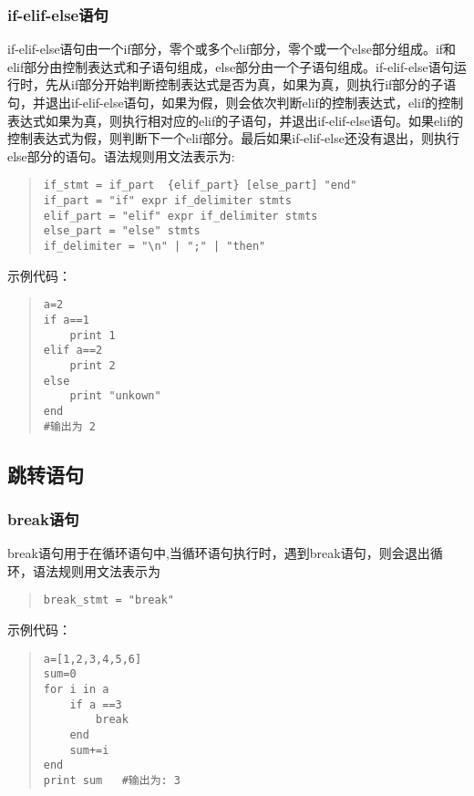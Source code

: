 \subsubsection{if-elif-else语句}
if-elif-else语句由一个if部分，零个或多个elif部分，零个或一个else部分组成。if和elif部分由控制表达式和子语句组成，else部分由一个子语句组成。if-elif-else语句运行时，先从if部分开始判断控制表达式是否为真，如果为真，则执行if部分的子语句，并退出if-elif-else语句，如果为假，则会依次判断elif的控制表达式，elif的控制表达式如果为真，则执行相对应的elif的子语句，并退出if-elif-else语句。如果elif的控制表达式为假，则判断下一个elif部分。最后如果if-elif-else还没有退出，则执行else部分的语句。语法规则用文法表示为:
\begin{quote}
\begin{verbatim}
if_stmt = if_part  {elif_part} [else_part] "end"
if_part = "if" expr if_delimiter stmts 
elif_part = "elif" expr if_delimiter stmts
else_part = "else" stmts
if_delimiter = "\n" | ";" | "then"
\end{verbatim}
\end{quote}
示例代码：
\begin{quote}
\begin{verbatim}
a=2
if a==1
    print 1
elif a==2
    print 2
else 
    print "unkown"
end 
#输出为 2
\end{verbatim}
\end{quote}

\subsection{跳转语句}
\subsubsection{break语句}
break语句用于在循环语句中,当循环语句执行时，遇到break语句，则会退出循环，语法规则用文法表示为
\begin{quote}
\begin{verbatim}
break_stmt = "break" 
\end{verbatim}
\end{quote}
示例代码：
\begin{quote}
\begin{verbatim}
a=[1,2,3,4,5,6] 
sum=0
for i in a
    if a ==3
        break
    end 
    sum+=i
end 
print sum   #输出为: 3
\end{verbatim}
\end{quote}

